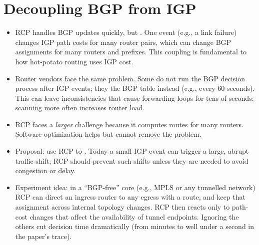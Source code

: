 \section{Decoupling BGP from IGP}\label{sec:rcp-decouple}
\begin{itemize}
\item RCP handles BGP updates quickly, but . One event (e.g., a link failure) changes IGP path costs for many router pairs, which can change BGP assignments for many routers and prefixes. This coupling is fundamental to how hot-potato routing uses IGP cost.
\item Router vendors face the same problem. Some do not run the BGP decision process after IGP events; they  the BGP table instead (e.g., every 60 seconds). This can leave inconsistencies that cause forwarding loops for tens of seconds; scanning more often increases router load.
\item RCP faces a \emph{larger} challenge because it computes routes for many routers. Software optimization helps but cannot remove the problem.
\item Proposal: use RCP to . Today a small IGP event can trigger a large, abrupt traffic shift; RCP should prevent such shifts unless they are needed to avoid congestion or delay.
\item Experiment idea: in a ``BGP-free'' core (e.g., MPLS or any tunnelled network) RCP can direct an ingress router to any egress with a route, and keep that assignment across internal topology changes. RCP then reacts only to path-cost changes that affect the availability of tunnel endpoints. Ignoring the others cut decision time dramatically (from minutes to well under a second in the paper's trace).
\end{itemize}

